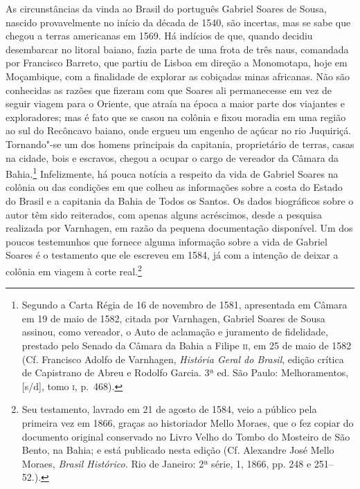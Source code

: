  As circunstâncias da vinda ao Brasil do português Gabriel Soares de
Sousa, nascido provavelmente no início da década de 1540, são incertas,
mas se sabe que chegou a terras americanas em 1569. Há indícios de que,
quando decidiu desembarcar no litoral baiano, fazia parte de uma frota
de três naus, comandada por Francisco Barreto, que partiu de Lisboa em
direção a Monomotapa, hoje em Moçambique, com a finalidade de explorar
as cobiçadas minas africanas. Não são conhecidas as razões que fizeram com que Soares ali
permanecesse em vez de seguir viagem para o Oriente, que atraía na
época a maior parte dos viajantes e exploradores; 
mas é fato que se casou na colônia e fixou moradia em uma região ao sul do
Recôncavo baiano, onde ergueu um engenho de açúcar no rio Juquiriçá.
Tornando"-se um dos homens principais da capitania, proprietário de
terras, casas na cidade, bois e escravos, chegou a ocupar o cargo de
vereador da Câmara da Bahia.\footnote{ Segundo a Carta Régia de 16 de
novembro de 1581, apresentada em Câmara em 19 de maio de 1582, citada
por Varnhagen, Gabriel Soares de Sousa assinou, como vereador, o Auto
de aclamação e juramento de fidelidade, prestado pelo Senado da Câmara
da Bahia a Filipe \textsc{ii}, em 25 de maio de 1582 (Cf. Francisco Adolfo de
Varnhagen, \textit{História Geral do Brasil}, edição crítica de Capistrano de 
Abreu e Rodolfo Garcia. 3ª ed. São Paulo: Melhoramentos, [s/d], tomo \textsc{i}, p.~468).}
Infelizmente, há pouca notícia a respeito da vida de Gabriel Soares na
colônia ou das condições em que colheu as informações sobre a costa do
Estado do Brasil e a capitania da Bahia de Todos os Santos. Os dados
biográficos sobre o autor têm sido reiterados, com apenas alguns
acréscimos, desde a pesquisa realizada por Varnhagen, em razão da
pequena documentação disponível. Um dos poucos testemunhos que fornece
alguma informação sobre a vida de Gabriel Soares é o testamento que ele
escreveu em 1584, já com a intenção de deixar a colônia em viagem à corte
real.\footnote{ Seu testamento, lavrado em 21 de agosto de 1584, veio a
público pela primeira vez em 1866, graças ao historiador Mello Moraes,
que o fez copiar do documento original conservado no Livro Velho do
Tombo do Mosteiro de São Bento, na Bahia; e está publicado nesta edição
(Cf. Alexandre José Mello Moraes, \textit{Brasil Histórico.} Rio de
Janeiro: 2ª série, 1, 1866, pp. 248 e 251--52.).}

